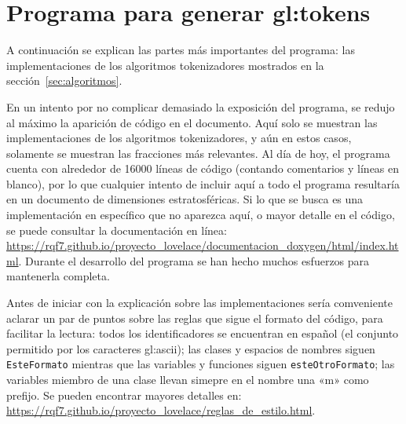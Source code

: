%
%
%

\section{Programa para generar \texorpdfstring{\glspl{gl:token}}{tokens}}

A continuación se explican las partes más importantes del programa:
las implementaciones de los algoritmos tokenizadores mostrados en la
sección~\ref{sec:algoritmos}.

En un intento por no complicar demasiado la exposición del programa, se  redujo
al máximo la aparición de código en el documento. Aquí solo se muestran las
implementaciones de los algoritmos tokenizadores, y aún en estos casos,
solamente se muestran las fracciones más relevantes. Al día de hoy, el programa
cuenta con alrededor de 16000 líneas de código (contando comentarios y líneas
en blanco), por lo que cualquier intento de incluir aquí a todo el programa
resultaría en un documento de dimensiones estratosféricas. Si lo que se busca
es una implementación en específico que no aparezca aquí, o mayor detalle en el
código, se puede consultar la documentación en línea:
\url{https://rqf7.github.io/proyecto_lovelace/documentacion_doxygen/html/index.html}.
Durante el desarrollo del programa se han hecho muchos esfuerzos para
mantenerla completa.

Antes de iniciar con la explicación sobre las implementaciones sería
comveniente aclarar un par de puntos sobre las reglas que sigue el formato del
código, para facilitar la lectura: todos los identificadores se encuentran en
español (el conjunto permitido por los caracteres \gls{gl:ascii}); las clases y
espacios de nombres siguen \texttt{EsteFormato} mientras que las variables y
funciones siguen \texttt{esteOtroFormato}; las variables miembro de una clase
llevan simepre en el nombre una «m» como prefijo. Se pueden encontrar mayores
detalles en:
\url{https://rqf7.github.io/proyecto_lovelace/reglas_de_estilo.html}.

